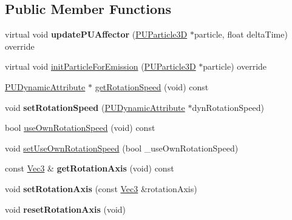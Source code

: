 \subsection*{Public Member Functions}
\begin{DoxyCompactItemize}
\item 
\mbox{\label{classPUGeometryRotator_a2c7dca654511b27ea90c338a9a21eac5}} 
virtual void {\bfseries update\+P\+U\+Affector} (\hyperlink{structPUParticle3D}{P\+U\+Particle3D} $\ast$particle, float delta\+Time) override
\item 
virtual void \hyperlink{classPUGeometryRotator_a552415ef8f78fd912c7c889119511aef}{init\+Particle\+For\+Emission} (\hyperlink{structPUParticle3D}{P\+U\+Particle3D} $\ast$particle) override
\item 
\hyperlink{classPUDynamicAttribute}{P\+U\+Dynamic\+Attribute} $\ast$ \hyperlink{classPUGeometryRotator_a9872dd18f2cb178f58b2251b9a81cd77}{get\+Rotation\+Speed} (void) const
\item 
\mbox{\label{classPUGeometryRotator_aacd07e9741796821c11feb7ea06008c8}} 
void {\bfseries set\+Rotation\+Speed} (\hyperlink{classPUDynamicAttribute}{P\+U\+Dynamic\+Attribute} $\ast$dyn\+Rotation\+Speed)
\item 
bool \hyperlink{classPUGeometryRotator_a112e63c42288c669fd121000a75444ba}{use\+Own\+Rotation\+Speed} (void) const
\item 
void \hyperlink{classPUGeometryRotator_a7245251b9b42b431685bca5a6066caff}{set\+Use\+Own\+Rotation\+Speed} (bool \+\_\+use\+Own\+Rotation\+Speed)
\item 
\mbox{\label{classPUGeometryRotator_a8b8f955fbaa8c8c6eb12073119241c4e}} 
const \hyperlink{classVec3}{Vec3} \& {\bfseries get\+Rotation\+Axis} (void) const
\item 
\mbox{\label{classPUGeometryRotator_af367c6c9850c3330130004d0b14673fb}} 
void {\bfseries set\+Rotation\+Axis} (const \hyperlink{classVec3}{Vec3} \&rotation\+Axis)
\item 
\mbox{\label{classPUGeometryRotator_a19a38e4306b83849b144bd93270297c9}} 
void {\bfseries reset\+Rotation\+Axis} (void)
\item 
\mbox{\label{classPUGeometryRotator_a54d0057f5e5abbbbd2a8b22ad2cf9f3e}} 

\end{DoxyCompactItemize}
